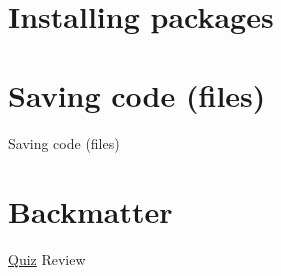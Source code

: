 \documentclass[
  11pt,
  ignorenonframetext,
]{beamer}
\begin{document}
\hypertarget{installing-packages}{%
\section{Installing packages}\label{installing-packages}}

\hypertarget{saving-code-files}{%
\section{Saving code (files)}\label{saving-code-files}}

\begin{frame}{Saving code (files)}
\end{frame}

\hypertarget{backmatter}{%
\section{Backmatter}\label{backmatter}}

\begin{frame}[fragile]{\protect\hyperlink{pop-quiz}{Quiz} Review}
\protect\hypertarget{quiz-review}{}
\end{frame}
\end{document}

